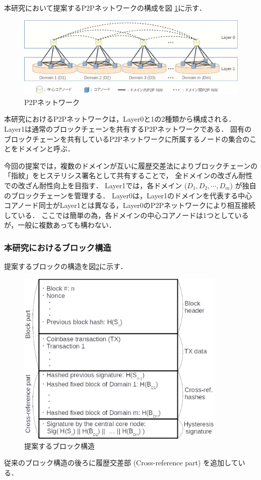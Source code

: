 \documentclass[a4paper,12pt]{jsarticle}
\begin{document}
本研究において提案するP2Pネットワークの構成を図 \ref{fig:p2p}に示す．
%
%
\begin{figure}[H]%
  \begin{center}
    \includegraphics[width=130mm]{pht/p2p_network_image_r1.eps}
  \end{center}
  \caption{P2Pネットワーク}
  \label{fig:p2p}
\end{figure}


本研究におけるP2Pネットワークは，Layer0と1の2種類から構成される．
Layer1は通常のブロックチェーンを共有するP2Pネットワークである．
固有のブロックチェーンを共有しているP2Pネットワークに所属するノードの集合のことをドメインと呼ぶ．

今回の提案では，複数のドメインが互いに履歴交差法によりブロックチェーンの「指紋」をヒステリシス署名として共有することで，
全ドメインの改ざん耐性での改ざん耐性向上を目指す．
Layer1では，各ドメイン ($D_1, D_2, \cdots, D_m$) が独自のブロックチェーンを管理する．
Layer0は，Layer1のドメインを代表する中心コアノード同士がLayer1とは異なる，Layer0のP2Pネットワークにより相互接続している．
ここでは簡単の為，各ドメインの中心コアノードは1つとしているが，一般に複数あっても構わない．

      \subsubsection{本研究におけるブロック構造}
提案するブロックの構造を図\ref{fig:block}に示す．
%
\begin{figure}[H]%
  \begin{center}
    \includegraphics[width=100mm]{pht/block_structure.eps}
  \end{center}
  \caption{提案するブロック構造}
  \label{fig:block}
\end{figure}
%
従来のブロック構造の後ろに履歴交差部 (Cross-reference part) を追加している．
\end{document}
